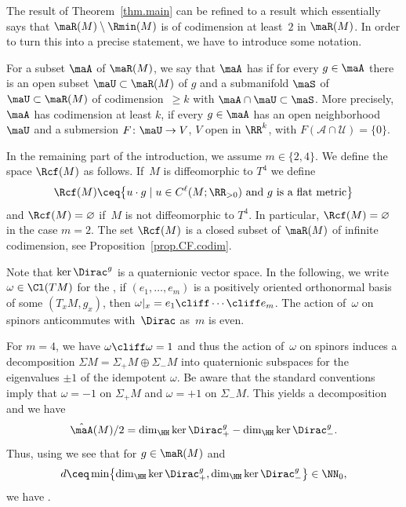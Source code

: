 The result of Theorem~\ref{thm.main} can be refined to a result which essentially says that $\maR(M)\setminus\Rmin(M)$ is of codimension at least~$2$ in $\maR(M)$. In order to turn this into a precise statement, we have to introduce some notation.

For a subset $\maA$ of $\maR(M)$, we say that $\maA$ has
if for every $g\in \maA$ there is an open subset $\maU\subset\maR(M)$ of $g$ and a submanifold $\maS$ of $\maU\subset \maR(M)$ of codimension~$\geq k$ with $\maA\cap \maU\subset \maS$.
More precisely, $\maA$ has
codimension at least $k$, if every $g\in \maA$ has an open neighborhood $\maU$ and a submersion $F\colon\maU\to V$, $V$ open in $\RR^k$, with $F(\mathcal{A}\cap\mathcal{U})=\{0\}$.

In the remaining part of the introduction, we assume $m\in\{2,4\}$.
We define the space $\Rcf(M)$ as follows. If~$M$ is diffeomorphic to $T^4$ we define
\[
\Rcf(M)\ceq \bigl\{u\cdot g\mid u\in C^\ell(M;\RR_{>0}) \text{ and $g$ is a flat metric}\bigr\}
\]
and $\Rcf(M)=\varnothing$ if~$M$ is not diffeomorphic to $T^4$. In particular, $\Rcf(M)=\varnothing$ in the case $m=2$.
The set $\Rcf(M)$ is a closed subset of $\maR(M)$ of infinite codimension, see Proposition~\ref{prop.CF.codim}.

Note that $\ker\Dirac^g$ is a quaternionic vector space. In the following, we write $\omega\in \Cl(TM)$ for the , \ie if $(e_1,\ldots,e_m)$ is a positively oriented orthonormal basis of some $(T_xM,g_x)$, then $\omega|_{x}=e_1\cliff\cdots\cliff e_m$.
The action of~$\omega$ on spinors anticommutes with~$\Dirac$ as~$m$ is even.

For $m=4$, we have $\omega\cliff \omega=1$ and thus the action of~$\omega$ on spinors induces a decomposition $\Sigma M=\Sigma_+M\oplus \Sigma_- M$ into quaternionic subspaces for the eigenvalues $\pm 1$ of the idempotent $\omega$. Be aware that the standard conventions imply that $\omega=-1$ on $\Sigma_+M$ and $\omega=+1$ on $\Sigma_-M$.
This yields a decomposition  and we have
\[
\hat \maA(M)/2 = \dim_\HH \ker\Dirac^g_+ - \dim_\HH \ker\Dirac^g_-.
\]
Thus, using  we see that for $g\in \maR(M)$ and
\[
d\ceq\min\bigl\{\dim_\HH \ker\Dirac^g_+,\dim_\HH \ker\Dirac^g_-\bigr\}\in \NN_0,
\]
we have .

